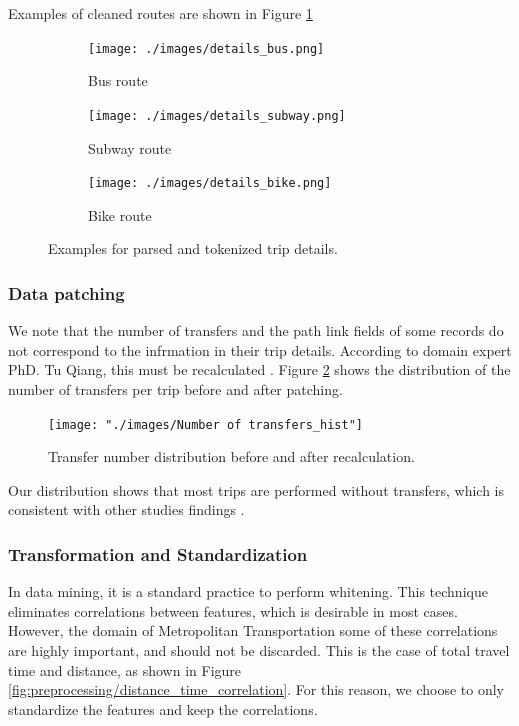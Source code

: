 \documentclass{article}
\begin{document}
Examples of cleaned routes are shown in Figure \ref{fig:preprocessing/parsed_routes}

\begin{figure}[H]
  \centering
  \begin{subfigure}[b]{.8\textwidth}
  	\centering
  	\texttt{[image: ./images/details\_bus.png]}
  	\caption{Bus route}
  \end{subfigure}
  \begin{subfigure}[b]{.8\textwidth}
  	\centering
  	\texttt{[image: ./images/details\_subway.png]}
  	\caption{Subway route}
  \end{subfigure}
    \begin{subfigure}[b]{.8\textwidth}
  	\centering
  	\texttt{[image: ./images/details\_bike.png]}
  	\caption{Bike route}
  \end{subfigure}
  \caption{Examples for parsed and tokenized trip details.}
  	\label{fig:preprocessing/parsed_routes}
\end{figure}



\subsubsection{Data patching}
We note that the number of transfers and the path link fields of some records do not correspond to the infrmation in their trip details. According to domain expert PhD. Tu Qiang, this must be recalculated \cite{tommy}. Figure \ref{fig:preprocessing/num_transfers} shows the distribution of the number of transfers per trip before and after patching.


\begin{figure}[H]
  \centering
  \texttt{[image: "./images/Number of transfers\_hist"]}
  \caption{Transfer number distribution before and after recalculation.}
  \label{fig:preprocessing/num_transfers}
\end{figure}

Our distribution shows that most trips are performed without transfers, which is consistent with other studies findings \cite{bhaskar2015passenger}.

\subsubsection{Transformation and Standardization} 
In data mining, it is a standard practice to perform whitening. This technique eliminates correlations between features, which is desirable in most cases. However, the domain of Metropolitan Transportation some of these correlations are highly important, and should not be discarded. This is the case of total travel time and distance, as shown in Figure \ref{fig:preprocessing/distance_time_correlation}. For this reason, we choose to only standardize the features and keep the correlations. 
\end{document}
